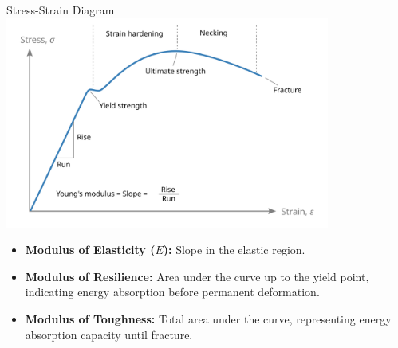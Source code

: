 \documentclass{beamer}
\begin{document}
\begin{frame}{Stress-Strain Diagram}
    \includegraphics[width=0.8\textwidth]{Stress_Strain_Curve.png}
    \begin{itemize}
        \item \textbf{Modulus of Elasticity ($E$):} Slope in the elastic region.
        \item \textbf{Modulus of Resilience:} Area under the curve up to the yield point, indicating energy absorption before permanent deformation.
        \item \textbf{Modulus of Toughness:} Total area under the curve, representing energy absorption capacity until fracture.
    \end{itemize}
\end{frame}

\end{document}
